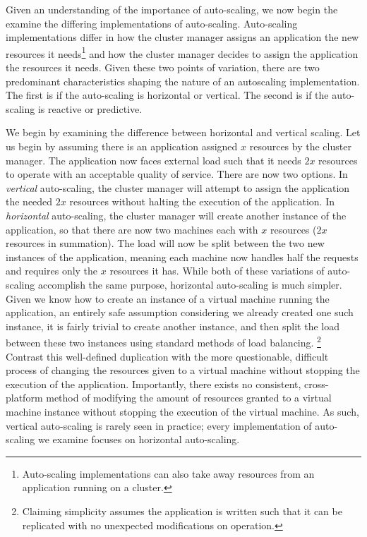 Given an understanding of the importance of auto-scaling, we now begin the
examine the differing implementations of auto-scaling. Auto-scaling
implementations differ in how the cluster manager assigns an application the new resources it
needs\footnote{Auto-scaling implementations can also take away resources from
an application running on a cluster.} and how the cluster manager decides to
assign the application the resources it needs. Given these two points of
variation, there are two predominant characteristics shaping the nature of an autoscaling
implementation. The first is if the auto-scaling is horizontal or vertical. The
second is if the auto-scaling is reactive or predictive.

We begin by examining the difference between horizontal and vertical scaling.
Let us begin by assuming there is an application assigned $x$ resources by the
cluster manager. The application
now faces external load such that it needs $2x$ resources to operate with an
acceptable quality of service. There are now two options. In
\textit{vertical} auto-scaling, the cluster manager will attempt to assign
the application the needed $2x$ resources
without halting the execution of the application. In \textit{horizontal}
auto-scaling, the cluster manager will create another instance of
the application, so that there are now two machines each with
$x$ resources ($2x$ resources in summation). The load will now be split between
the two new instances of the application, meaning each machine now handles half
the requests and requires only the $x$ resources it has.\cite[pg.
4]{auto-scaling-techniques-for-elastic-applications-in-cloud-environments} While
both of these variations of auto-scaling accomplish the same purpose, horizontal
auto-scaling is much simpler. Given we know how to create an instance of a
virtual machine running the application, an entirely safe assumption
considering we already created one such instance, it is fairly trivial to create
another instance, and then split the load between these two instances using
standard methods of load balancing. \footnote{Claiming
simplicity assumes the application is written
such that it can be replicated with no unexpected modifications
on operation.} Contrast this well-defined duplication with the more questionable, difficult
process of changing the resources given to a virtual machine without stopping
the execution of the application. Importantly, there exists
no consistent, cross-platform method of
modifying the amount of resources granted to a virtual machine instance without
stopping the execution of the virtual machine. As such, vertical auto-scaling is
rarely seen in practice; every implementation of
auto-scaling we examine focuses on horizontal auto-scaling.\cite[pg.
4]{auto-scaling-techniques-for-elastic-applications-in-cloud-environments}

